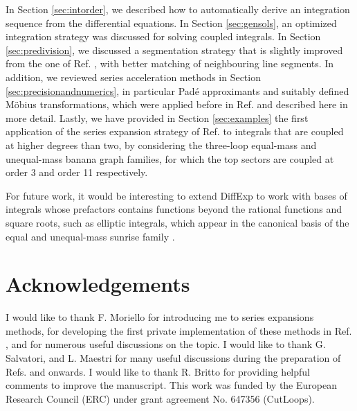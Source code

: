 \documentclass{article}
\begin{document}
In Section \ref{sec:intorder}, we described how to automatically derive an integration sequence from the differential equations. In Section \ref{sec:gensols}, an optimized integration strategy was discussed for solving coupled integrals. In Section \ref{sec:predivision}, we discussed a segmentation strategy that is slightly improved from the one of Ref. \cite{Frellesvig:2019byn}, with better matching of neighbouring line segments. In addition, we reviewed series acceleration methods in Section \ref{sec:precisionandnumerics}, in particular Padé approximants and suitably defined Möbius transformations, which were applied before in Ref. \cite{Frellesvig:2019byn} and described here in more detail. Lastly, we have provided in Section \ref{sec:examples} the first application of the series expansion strategy of Ref. \cite{Francesco:2019yqt} to integrals that are coupled at higher degrees than two, by considering the three-loop equal-mass and unequal-mass banana graph families, for which the top sectors are coupled at order 3 and order 11 respectively. 

For future work, it would be interesting to extend DiffExp to work with bases of integrals whose prefactors contains functions beyond the rational functions and square roots, such as elliptic integrals, which appear in the canonical basis of the equal and unequal-mass sunrise family \cite{Adams:2018yfj, Bogner:2019lfa}.

\section*{Acknowledgements}
I would like to thank F. Moriello for introducing me to series expansions methods, for developing the first private implementation of these methods in Ref. \cite{Francesco:2019yqt}, and for numerous useful discussions on the topic. I would like to thank G. Salvatori, and L. Maestri for many useful discussions during the preparation of Refs. \cite{Bonciani:2019jyb, Frellesvig:2019byn} and onwards. I would like to thank R. Britto for providing helpful comments to improve the manuscript. This work was funded by the European Research Council (ERC) under grant agreement No. 647356 (CutLoops).



\end{document}
